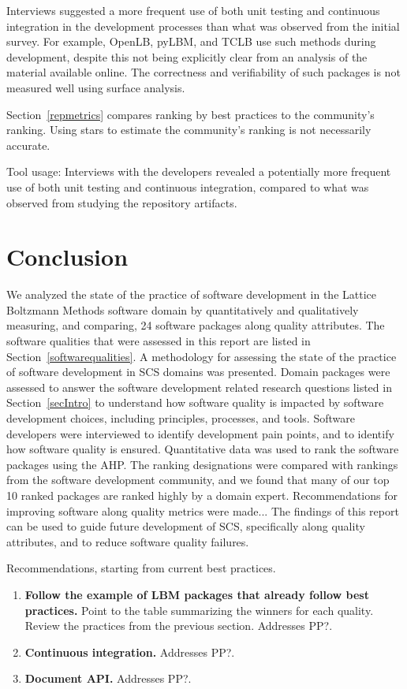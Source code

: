 \documentclass[final, 3p, times, authoryear]{elsarticle}
\begin{document}
Interviews suggested a more frequent use of both unit testing and continuous
integration in the development processes than what was observed from the initial
survey. For example, OpenLB, pyLBM, and TCLB use such methods during
development, despite this not being explicitly clear from an analysis of the
material available online.  The correctness and verifiability of such packages
is not measured well using surface analysis.

Section~\ref{repmetrics} compares ranking by best practices to the community's
ranking.  Using stars to estimate the community's ranking is not necessarily
accurate.

Tool usage: Interviews with the developers revealed a potentially more frequent
use of both unit testing and continuous integration, compared to what was
observed from studying the repository artifacts.

\section{Conclusion} \label{conclusion}

We analyzed the state of the practice of software development in the Lattice
Boltzmann Methods software domain by quantitatively and qualitatively measuring,
and comparing, 24 software packages along quality attributes. The software
qualities that were assessed in this report are listed in
Section~\ref{softwarequalities}. A methodology for assessing the state of the
practice of software development in SCS domains was presented. Domain packages
were assessed to answer the software development related research questions
listed in Section~\ref{secIntro} to understand how software quality is impacted
by software development choices, including principles, processes, and tools.
Software developers were interviewed to identify development pain points, and to
identify how software quality is ensured. Quantitative data was used to rank the
software packages using the AHP. The ranking designations were compared with
rankings from the software development community, and we found that many of our
top 10 ranked packages are ranked highly by a domain expert. Recommendations for
improving software along quality metrics were made... The findings of this
report can be used to guide future development of SCS, specifically along
quality attributes, and to reduce software quality failures.

Recommendations, starting from current best practices.

\begin{enumerate}
	\item \textbf{Follow the example of LBM packages that already follow best practices.}  Point to the table summarizing the winners for each quality.  Review the practices from the previous section.  Addresses PP?.
	\item \textbf{Continuous integration.} Addresses PP?.
	\item \textbf{Document API.} Addresses PP?.
\end{enumerate}
\end{document}
